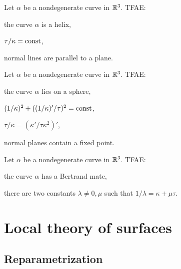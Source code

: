 \documentclass{../note}
\def\a{\alpha}
\begin{document}
\begin{prb}[Helices]
Let $\a$ be a nondegenerate curve in $\mathbb{R}^3$.
TFAE:
\begin{parts}
\item the curve $\a$ is a helix,
\item $\tau/\kappa=\operatorname{const}$,
\item normal lines are parallel to a plane.
\end{parts}
\end{prb}

\begin{prb}
Let $\a$ be a nondegenerate curve in $\mathbb{R}^3$.
TFAE:
\begin{parts}
\item the curve $\a$ lies on a sphere,
\item $(1/\kappa)^2+((1/\kappa)'/\tau)^2=\operatorname{const}$,
\item $\tau/\kappa=(\kappa'/\tau\kappa^2)'$,
\item normal planes contain a fixed point.
\end{parts}
\end{prb}

\begin{prb}
Let $\a$ be a nondegenerate curve in $\mathbb{R}^3$.
TFAE:
\begin{parts}
\item the curve $\a$ has a Bertrand mate,
\item there are two constants $\lambda\ne0,\mu$ such that $1/\lambda=\kappa+\mu\tau$.
\end{parts}
\end{prb}












\chapter{Local theory of surfaces}

\section{Reparametrization}

\end{document}
